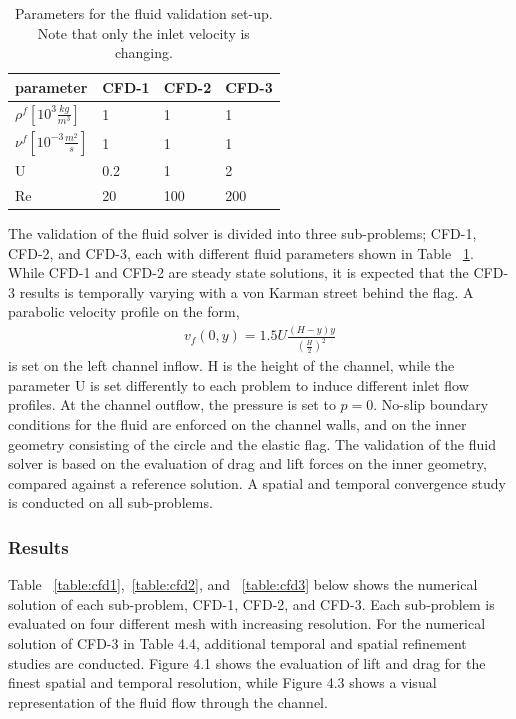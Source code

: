 \newpage
\begin{table}[h!]
\centering
\begin{tabular}{ |p{3cm}||p{2cm}|p{2cm}|p{2cm}|  }
\hline
 parameter              & CFD-1 & CFD-2 & CFD-3 \\
 \hline
$\rho^f [10^{3}\frac{kg}{m^3}]$ & 1    & 1    & 1    \\
$\nu^f  [10^{-3}\frac{m^2}{s}]$  & 1    & 1    & 1    \\
U                      & 0.2  & 1    & 2    \\
Re                     & 20   & 100  & 200 \\
\hline
\end{tabular}
\caption{Parameters for the fluid validation set-up. Note that only the inlet velocity is changing.}
\label{sec:cfdparam}
\end{table}
The validation of the fluid solver is divided into three sub-problems; CFD-1, CFD-2, and CFD-3, each with different fluid parameters shown in Table ~\ref{sec:cfdparam}. While CFD-1 and CFD-2 are steady state solutions, it is expected that the CFD-3 results is temporally varying with a von Karman street behind the flag. A parabolic velocity profile on the form,
\begin{align*}
v_f(0, y) = 1.5 U\frac{(H -y)y}{(\frac{H}{2})^2}
\end{align*}
is set on the left channel inflow. H is the height of the channel, while the parameter U is set differently to each problem to induce different inlet flow profiles. At the channel outflow, the pressure is set to $p = 0$. No-slip boundary conditions for the fluid are enforced on the channel walls, and on the inner geometry consisting of the circle and the elastic flag. The validation of the fluid solver is based on the evaluation of drag and lift forces on the inner geometry, compared against a reference solution. A spatial and temporal convergence study is conducted on all sub-problems. 

\subsubsection*{Results}
Table ~\ref{table:cfd1},~\ref{table:cfd2}, and ~\ref{table:cfd3} below shows the numerical solution of each sub-problem, CFD-1, CFD-2, and CFD-3. Each sub-problem is evaluated on four different mesh with increasing resolution. For the numerical solution of CFD-3 in Table 4.4, additional temporal and spatial refinement studies are conducted. Figure 4.1 shows the evaluation of lift and drag for the finest spatial and temporal resolution, while Figure 4.3 shows a visual representation of the fluid flow through the channel. 

